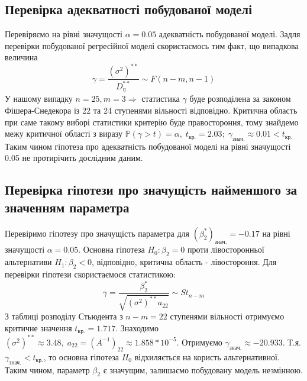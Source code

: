 \documentclass{article}
\begin{document}
    \subsection{Перевірка адекватності побудованої моделі}
      Перевіряємо на рівні значущості $\alpha = 0.05$ адекватність побудованої моделі.  
      Задля перевірки побудованої регресійної моделі скористаємось тим факт, що 
      випадкова величина 
      \begin{equation}
        \gamma = \frac{(\sigma^2)^{**}}{D^{**}_\eta}\sim F(n-m, n-1)
      \end{equation}
      У нашому випадку $n = 25, m = 3 \Rightarrow$ статистика $\gamma$ буде 
      розподілена за законом Фішера-Снедекора із 22 та 24 ступенями вільності 
      відповідно.
      Критична область при саме такому виборі статистики критерію буде правостороння, 
      тому знайдемо межу критичної області з виразу $\mathbb{P}
      (\gamma > t) = \alpha, \; t_{\text{кр.}} = 2.03;\;
      \gamma_\text{знач.} \approx 0.01 < t_\text{кр.}$
      Таким чином гіпотеза про адекватність побудованої моделі на рівні значущості 
      0.05 не протирічить дослідним даним.
    \subsection{Перевірка гіпотези про значущість найменшого за значенням параметра}
      Перевіримо гіпотезу про значущість параметра для $(\beta_2^*)_{\text{знач.}} = 
      -0.17$ на рівні значущості $\alpha = 0.05$. Основна гіпотеза $ H_0 : \beta_2 = 0$ проти лівосторонньої 
      альтернативи $ H_1 : \beta_2 < 0$, відповідно, критична область - 
      лівостороння. Для перевірки гіпотези скористаємося статистикою:
      \begin{equation}
        \gamma = \frac{\beta_2^*}{\sqrt{(\sigma^2)^{**} a_{22}}} \sim St_{n-m}
      \end{equation}
      З таблиці розподілу Стьюдента з $n - m = 22$ ступенями вільності 
      отримуємо критичне значення $t_\text{кр.} = 1.717$. Знаходимо $(\sigma^2)^{**} 
      \approx 3.48, \; a_{22} = (A^{-1})_{22} \approx 1.858 * 10^{-5}$. Отримуємо 
      $\gamma_\text{знач.} \approx -20.933$. Т.я. $\gamma_\text{знач.} < t_\text{кр.}$, 
      то основна гіпотеза $H_0$ відхиляється на користь альтернативної. Таким чином, 
      параметр $\beta_2$ є значущим, залишаємо побудовану модель незмінною.
\end{document}
